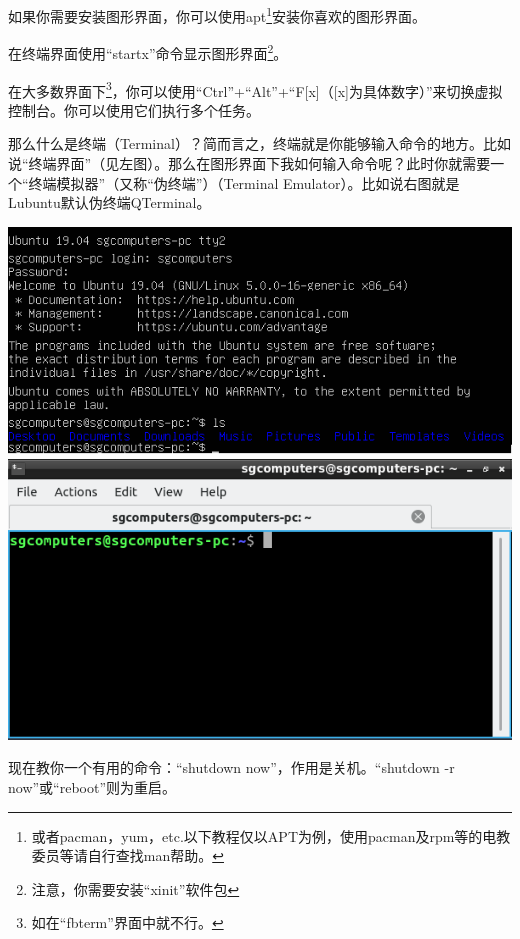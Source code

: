 \documentclass{book}
\begin{document}
如果你需要安装图形界面，你可以使用apt\footnote{或者pacman，yum，etc.以下教程仅以APT为例，使用pacman及rpm等的电教委员等请自行查找man帮助。}安装你喜欢的图形界面。\par
在终端界面使用“startx”命令显示图形界面\footnote{注意，你需要安装“xinit”软件包}。\par
在大多数界面下\footnote{如在“fbterm”界面中就不行。}，你可以使用“Ctrl”+“Alt”+“F[x]（[x]为具体数字）”来切换虚拟控制台。你可以使用它们执行多个任务。\par
那么什么是终端（Terminal）？简而言之，终端就是你能够输入命令的地方。比如说“终端界面”（见左图）。那么在图形界面下我如何输入命令呢？此时你就需要一个“终端模拟器”（又称“伪终端”）（Terminal Emulator）。比如说右图就是Lubuntu默认伪终端QTerminal。
\begin{center}
	\includegraphics[scale=0.9]{pic/term1} \includegraphics[scale=0.9]{pic/term2}
\end{center}
现在教你一个有用的命令：“shutdown now”，作用是关机。“shutdown -r now”或“reboot”则为重启。
\end{document}
